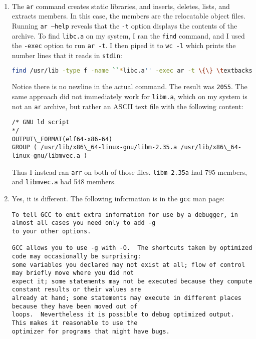 \documentclass[12pt]{article}
\newenvironment{sol}[1][Solution]{\begin{trivlist}
		\item[\hskip \labelsep {\bfseries #1:}]}{\end{trivlist}}
\begin{document}
\begin{sol}
	\
	\begin{enumerate}[label=(\alph*)]
		\item The \texttt{ar} command creates static libraries, and inserts, deletes, lists, and extracts
		members. In this case, the members are the relocatable object files. Running \texttt{ar --help}
		reveals that the \texttt{-t} option displays the contents of the archive. To find \texttt{libc.a}
		on my system, I ran the \texttt{find} command, and I used the \texttt{-exec} option to run
		\texttt{ar -t}. I then piped it to \texttt{wc -l} which prints the number lines that it reads
		in \texttt{stdin}:
		\begin{lstlisting}[language={bash}]
find /usr/lib -type f -name ``*libc.a'' -exec ar -t \{\} \textbackslash{}; | wc -l
		\end{lstlisting}
		Notice there is no newline in the actual command. The result was \texttt{2055}. The same
		approach did not immediately work for \texttt{libm.a}, which on my system is not an \texttt{ar}
		archive, but rather an ASCII text file with the following content:
		\begin{lstlisting}[language={}]
/* GNU ld script
*/
OUTPUT\_FORMAT(elf64-x86-64)
GROUP ( /usr/lib/x86\_64-linux-gnu/libm-2.35.a /usr/lib/x86\_64-linux-gnu/libmvec.a )
		\end{lstlisting}
		Thus I instead ran \texttt{arr} on both of those files. \texttt{libm-2.35a} had 795 members,
		and \texttt{libmvec.a} had 548 members.
		\item Yes, it is different. The following information is in the \texttt{gcc} man page:
		\begin{lstlisting}[language={}]
To tell GCC to emit extra information for use by a debugger, in almost all cases you need only to add -g
to your other options.

GCC allows you to use -g with -O.  The shortcuts taken by optimized code may occasionally be surprising:
some variables you declared may not exist at all; flow of control may briefly move where you did not
expect it; some statements may not be executed because they compute constant results or their values are
already at hand; some statements may execute in different places because they have been moved out of
loops.  Nevertheless it is possible to debug optimized output.  This makes it reasonable to use the
optimizer for programs that might have bugs.


\end{lstlisting}
\end{enumerate}
\end{sol}
\end{document}

